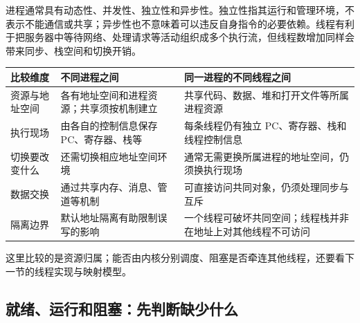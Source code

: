 进程通常具有动态性、并发性、独立性和异步性。独立性指其运行和管理环境，不表示不能通信或共享；异步性也不意味着可以违反自身指令的必要依赖。线程有利于把服务器中等待网络、处理请求等活动组织成多个执行流，但线程数增加同样会带来同步、栈空间和切换开销。

\begin{wideblock}

\par\medskip\noindent\begin{minipage}{\linewidth}\fontsize{9.3}{12}\selectfont\begin{tabularx}{\linewidth}{@{}YYY@{}}
\toprule\noalign{}
\begin{minipage}[b]{\linewidth}\raggedright
比较维度
\end{minipage} & \begin{minipage}[b]{\linewidth}\raggedright
不同进程之间
\end{minipage} & \begin{minipage}[b]{\linewidth}\raggedright
同一进程的不同线程之间
\end{minipage} \\
\midrule\noalign{}


资源与地址空间 & 各有地址空间和进程资源；共享须按机制建立 & 共享代码、数据、堆和打开文件等所属进程资源 \\
执行现场 & 由各自的控制信息保存 PC、寄存器、栈等 & 每条线程仍有独立 PC、寄存器、栈和线程控制信息 \\
切换要改变什么 & 还需切换相应地址空间环境 & 通常无需更换所属进程的地址空间，仍须换执行现场 \\
数据交换 & 通过共享内存、消息、管道等机制 & 可直接访问共同对象，仍须处理同步与互斥 \\
隔离边界 & 默认地址隔离有助限制误写的影响 & 一个线程可破坏共同空间；线程栈并非在地址上对其他线程不可访问 \\
\bottomrule\end{tabularx}
\end{minipage}\par\medskip

\end{wideblock}

这里比较的是资源归属；能否由内核分别调度、阻塞是否牵连其他线程，还要看下一节的线程实现与映射模型。

\subsection{就绪、运行和阻塞：先判断缺少什么}\label{OS02-2-2}

